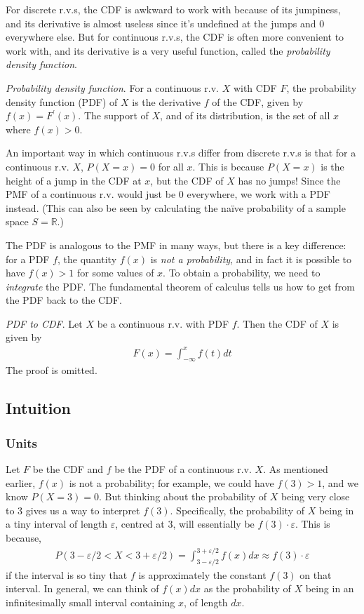 \documentclass[11pt,a4paper]{article}
\begin{document}
For discrete r.v.s, 
the CDF is awkward to work with because of its jumpiness, 
and its derivative is almost useless since it's undefined at 
the jumps and 0 everywhere else. 
But for continuous r.v.s, 
the CDF is often more convenient to work with, 
and its derivative is a very useful function, 
called the \emph{probability density function}.

\emph{Probability density function}. 
For a continuous r.v. \(X\) with CDF \(F\), 
the probability density function (PDF) of \(X\) is the derivative \(f\) of the CDF, 
given by \(f(x) = F^{\prime}(x)\). 
The support of \(X\), and of its distribution, 
is the set of all \(x\) where
\(f(x) > 0\).

An important way in which continuous r.v.s differ from discrete r.v.s 
is that for a continuous r.v. \(X\), 
\(P(X = x) = 0\) for all \(x\). 
This is because \(P(X = x)\) is the height of a jump in the CDF at \(x\), 
but the CDF of \(X\) has no jumps! 
Since the PMF of a continuous r.v. would just be 0 everywhere, 
we work with a PDF instead. 
(This can also be seen by calculating the naïve probability of a sample space \(S=\mathbb{R}\).)

The PDF is analogous to the PMF in many ways, 
but there is a key difference: for a PDF \(f\), 
the quantity \(f(x)\) is \emph{not a probability}, 
and in fact it is possible to have \(f(x) > 1\) for some values of \(x\). 
To obtain a probability, 
we need to \emph{integrate} the PDF. 
The fundamental theorem of calculus tells us how to get from the PDF back to the CDF.

\emph{PDF to CDF}. 
Let \(X\) be a continuous r.v. with PDF \(f\). 
Then the CDF of \(X\) is given by
\begin{align}
F(x) = \int_{- \infty}^{x}{f(t)}dt
\end{align}
The proof is omitted.

\subsection{Intuition}

\subsubsection{Units}

Let \(F\) be the CDF and \(f\) be the PDF of a continuous r.v. \(X\). 
As mentioned earlier, 
\(f(x)\) is not a probability; 
for example, we could have \(f(3) > 1\), and we know \(P(X = 3) = 0\). 
But thinking about the probability of \(X\) being very close to 3 gives us a way to interpret \(f(3)\). 
Specifically, the probability of \(X\) being in a tiny interval of length \(\varepsilon\),
centred at 3, will essentially be \(f(3) \cdot \varepsilon\). 
This is because,
\begin{align}
P(3 - \varepsilon/2 < X < 3 + \varepsilon/2) = 
\int_{3 - \varepsilon/2}^{3 + \varepsilon/2}{f(x)}dx \approx f(3) \cdot \varepsilon
\end{align}
if the interval is so tiny that \(f\) is approximately the constant \(f(3)\) on that interval. 
In general, 
we can think of \(f(x)dx\) as the probability of \(X\) being in 
an infinitesimally small interval containing \(x\), of length \(dx\).
\end{document}
